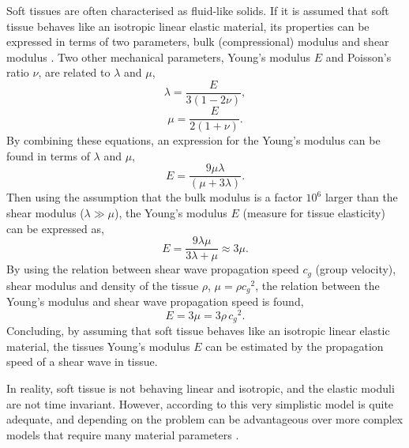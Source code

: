 Soft tissues are often characterised as fluid-like solids. If it is assumed that soft tissue behaves like an isotropic linear elastic material, its properties can be expressed in terms of two parameters, bulk (compressional) modulus and shear modulus \cite{sarvazyan_biophysical_1995}. Two other mechanical parameters, Young's modulus $E$ and Poisson's ratio $\nu$, are related to $\lambda$ and $\mu$,
\begin{equation}
    \label{eq:K}
    \lambda = \frac{E}{3(1-2\nu)},
\end{equation}
\begin{equation}
    \label{eq:G}
    \mu = \frac{E}{2(1+\nu)}.
\end{equation}
By combining these equations, an expression for the Young's modulus can be found in terms of $\lambda$ and $\mu$, 
\begin{equation}
    E = \frac{9 \mu \lambda}{(\mu + 3 \lambda)}.
\end{equation}
Then using the assumption that the bulk modulus is a factor $10^6$ larger than the shear modulus ($\lambda \gg \mu$), the Young's modulus $E$ (measure for tissue elasticity) can be expressed as,
\begin{equation}
    E = \frac{9 \lambda \mu}{3\lambda + \mu} \approx 3 \mu.
\end{equation}
By using the relation between shear wave propagation speed $c_g$ (group velocity), shear modulus and density of the tissue $\rho$, $\mu = \rho {c_g}^2$, the relation between the Young's modulus and shear wave propagation speed is found,
\begin{equation}
    E = 3 \mu = 3 \rho \, {c_g}^2.
\end{equation}
Concluding, by assuming that soft tissue behaves like an isotropic linear elastic material, the tissues Young's modulus $E$ can be estimated by the propagation speed of a shear wave in tissue. 

In reality, soft tissue is not behaving linear and isotropic, and the elastic moduli are not time invariant. However, according to \citeauthor{sarvazyan_biophysical_1995} this very simplistic model is quite adequate, and depending on the problem can be advantageous over more complex models that require many material parameters \cite{sarvazyan_biophysical_1995}.




